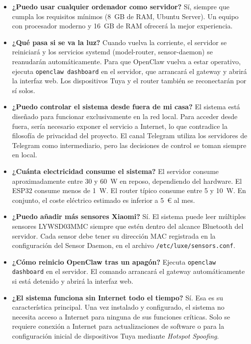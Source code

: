 \begin{itemize}
    \item \textbf{¿Puedo usar cualquier ordenador como servidor?} Sí, siempre que cumpla los requisitos mínimos (8~GB de RAM, Ubuntu Server). Un equipo con procesador moderno y 16~GB de RAM ofrecerá la mejor experiencia.

    \item \textbf{¿Qué pasa si se va la luz?} Cuando vuelva la corriente, el servidor se reiniciará y los servicios systemd (model-router, sensor-daemon) se reanudarán automáticamente. Para que OpenClaw vuelva a estar operativo, ejecuta \texttt{openclaw dashboard} en el servidor, que arrancará el gateway y abrirá la interfaz web. Los dispositivos Tuya y el router también se reconectarán por sí solos.

    \item \textbf{¿Puedo controlar el sistema desde fuera de mi casa?} El sistema está diseñado para funcionar exclusivamente en la red local. Para acceder desde fuera, sería necesario exponer el servicio a Internet, lo que contradice la filosofía de privacidad del proyecto. El canal Telegram utiliza los servidores de Telegram como intermediario, pero las decisiones de control se toman siempre en local.

    \item \textbf{¿Cuánta electricidad consume el sistema?} El servidor consume aproximadamente entre 30 y 60~W en reposo, dependiendo del hardware. El ESP32 consume menos de 1~W. El router típico consume entre 5 y 10~W. En conjunto, el coste eléctrico estimado es inferior a 5~\euro{} al mes.

    \item \textbf{¿Puedo añadir más sensores Xiaomi?} Sí. El sistema puede leer múltiples sensores LYWSD03MMC siempre que estén dentro del alcance Bluetooth del servidor. Cada sensor debe tener su dirección MAC registrada en la configuración del Sensor Daemon, en el archivo \texttt{/etc/luxe/sensors.conf}.

    \item \textbf{¿Cómo reinicio OpenClaw tras un apagón?} Ejecuta \texttt{openclaw dashboard} en el servidor. El comando arrancará el gateway automáticamente si está detenido y abrirá la interfaz web.

    \item \textbf{¿El sistema funciona sin Internet todo el tiempo?} Sí. Esa es su característica principal. Una vez instalado y configurado, el sistema no necesita acceso a Internet para ninguna de sus funciones críticas. Solo se requiere conexión a Internet para actualizaciones de software o para la configuración inicial de dispositivos Tuya mediante \textit{Hotspot Spoofing}.


\end{itemize}
